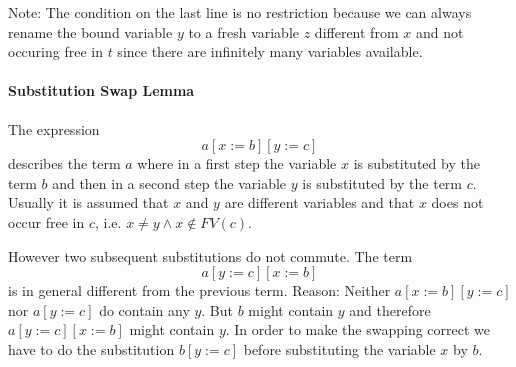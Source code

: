 Note: The condition on the last line is no restriction because we can always
rename the bound variable $y$ to a fresh variable $z$ different from $x$ and
not occuring free in $t$ since there are infinitely many variables available.


\paragraph{Substitution Swap Lemma}

The expression
$$a[x:=b][y:=c]$$ describes the term $a$ where in a first step the variable
$x$ is substituted by the term $b$ and then in a second step the variable $y$
is substituted by the term $c$. Usually it is assumed that $x$ and $y$ are
different variables and that $x$ does not occur free in $c$, i.e. $x\ne y
\land x \notin FV(c)$.

However two subsequent substitutions do not commute. The term
$$ a[y:=c][x:=b]$$ is in general different from the previous term.
Reason: Neither $a[x:=b][y:=c]$ nor $a[y:=c]$ do contain any
$y$. But $b$ might contain $y$ and therefore $a[y:=c][x:=b]$ might contain
$y$. In order to make the swapping correct we have to do the substitution
$b[y:=c]$ before substituting the variable $x$ by $b$.

